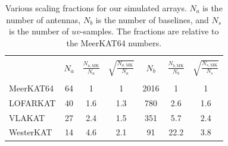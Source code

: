 \documentclass{aa}
\begin{document}
\begin{table}
\begin{center}
  \begin{tabular}[]{lcccccc}
  \hline
  \hline
 & & & & & &\\ [-1ex]
  & $N_a$ & $\frac{N_{a,\mathrm{MK}}}{N_a}$ & $\sqrt{\frac{N_{a,\mathrm{MK}}}{N_a}}$ & $N_b$ & $\frac{N_{b,\mathrm{MK}}}{N_b}$ & $\sqrt{\frac{N_{s,\mathrm{MK}}}{N_s}}$ \\
  \hline
  & & & & & &\\ [-1ex]
MeerKAT64 & 64 & 1 & 1 & 2016 & 1 & 1 \\
LOFARKAT & 40 & 1.6 & 1.3 & 780 & 2.6 & 1.6 \\
VLAKAT & 27 & 2.4 & 1.5 & 351 & 5.7 & 2.4 \\
WesterKAT & 14 & 4.6 & 2.1 & 91 & 22.2 & 3.8 \\
  \hline
  \end{tabular}
\end{center}
\caption{\label{tab:kats}Various scaling fractions for our simulated arrays. $N_a$ is the number of antennas, $N_b$ is the number of baselines, and $N_s$ is the number of $uv$-samples. The fractions are relative to the MeerKAT64 numbers.}
\end{table}
\end{document}
